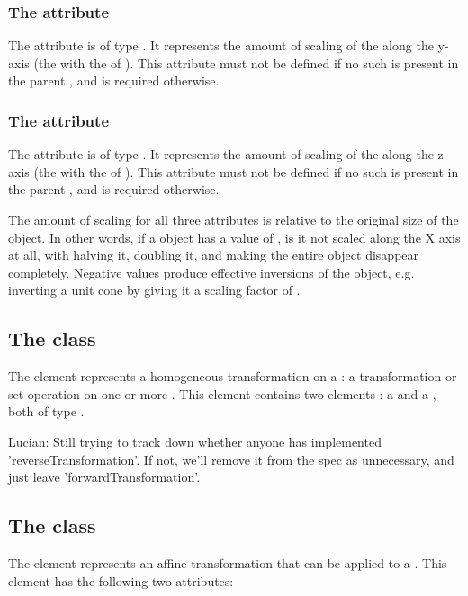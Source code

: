 \subsubsection{The \fixttspace{} attribute}
The  attribute is of type . It represents the amount of scaling of the \CSGNode along the y-axis (the \CoordinateComponent with the  of ).  This attribute must not be defined if no such \CoordinateComponent is present in the parent \Geometry, and is required otherwise.

\subsubsection{The \fixttspace{} attribute}
The  attribute is of type . It represents the amount of scaling of the \CSGNode along the z-axis (the \CoordinateComponent with the  of ).  This attribute must not be defined if no such \CoordinateComponent is present in the parent \Geometry, and is required otherwise.

The amount of scaling for all three attributes is relative to the original size of the object.  In other words, if a \CSGScale object has a  value of , is it not scaled along the X axis at all, with  halving it,  doubling it, and  making the entire object disappear completely.  Negative values produce effective inversions of the object, e.g. inverting a unit cone by giving it a  scaling factor of .


\subsection{The  class}
\label{csghomogeneoustransformation-class}
The \CSGHomogeneousTransformation element represents a homogeneous transformation on a \CSGNode: a transformation or set operation on one or more \CSGPrimitives. This element contains two \TransformationComponent elements : a  and a , both of type \TransformationComponent.

{\color{red} Lucian: \notice Still trying to track down whether anyone has implemented 'reverseTransformation'.  If not, we'll remove it from the spec as unnecessary, and just leave 'forwardTransformation'.}


\subsection{The  class}
\label{transformationcomponent-class}
The \TransformationComponent element represents an affine transformation that can be applied to a \CSGNode. This element has the following two attributes:

